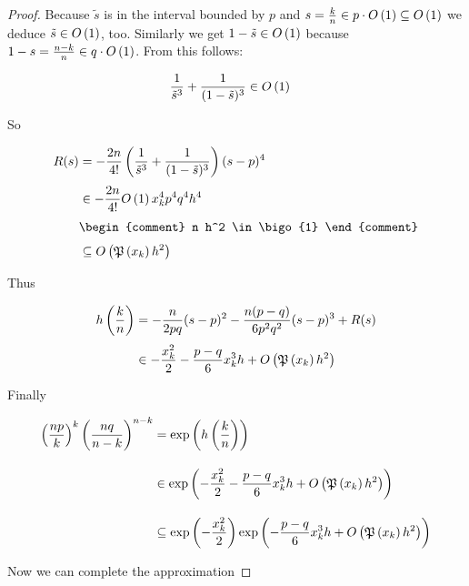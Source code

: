 \begin{proof}
  Because $\tilde s$ is in the interval bounded by $p$ and $s=\frac kn \in p \cdot O\left( {1} \right) \subseteq O\left( {1} \right)$ we deduce $\tilde s \in O\left( {1} \right)$, too. Similarly we get $1-\tilde s\in O\left( {1} \right)$ because $1-s = \frac{n-k}{n} \in q \cdot O\left( {1} \right)$. From this follows:

  \begin{align}
    \frac 1{\tilde s^3} + \frac 1{(1-\tilde s)^3} & \in O\left( {1} \right)
  \end{align}

  \noindent So

  \begin{align}
    R(s) & = -\frac{2n}{4!} \left(\frac 1{\tilde s^3} + \frac 1{(1-\tilde s)^3}\right) (s-p)^4 \nl
    & \in -\frac{2n}{4!} \bigo{1} \x^4 p^4 q^4 h^4 \nl
    &
    \begin{comment}
      n h^2 \in \bigo{1}
    \end{comment} \nl
    & \subseteq \bigo{\pol{\x} h^2}
  \end{align}

  \noindent Thus

  \begin{align}
    \h{\frac kn} &=-\frac{n}{2pq} (s-p)^2 - \frac{n(p-q)}{6p^2q^2} (s-p)^3 + R(s) \nl
    & \in -\frac{\x^2}{2} - \frac{p-q}{6} \x^3 h + \bigo{\pol{\x} h^2}
  \end{align}

  \noindent Finally

  \begin{align}
    \left(\frac{np}{k}\right)^k \left(\frac{nq}{n-k}\right)^{n-k} & = \fexp{\h{\frac kn}} \bnl
    & \in \fexp{-\frac{\x^2}{2} - \frac{p-q}{6} \x^3 h + \bigo{\pol{\x} h^2}} \bnl
    & \subseteq \fexp{-\frac{\x^2}{2}} \fexp{-\frac{p-q}6 \x^3 h + \bigo{\pol{\x} h^2}}
  \end{align}

  \noindent Now we can complete the approximation


\end{proof}
